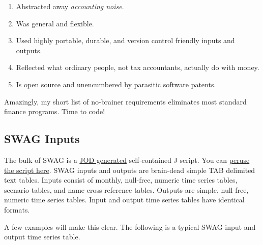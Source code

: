 \begin{enumerate}
\def\labelenumi{\arabic{enumi}.}
\item
  Abstracted away \emph{accounting noise}.
\item
  Was general and flexible.
\item
  Used highly portable, durable, and version control friendly inputs and
  outputs.
\item
  Reflected what ordinary people, not tax accountants, actually do with
  money.
\item
  Is open source and unencumbered by parasitic software patents.
\end{enumerate}

Amazingly, my short list of no-brainer requirements eliminates most
standard finance programs. Time to code!

\subsection*{SWAG Inputs}%

The bulk of SWAG is a
\href{http://code.jsoftware.com/wiki/Addons/general/jod}{JOD generated}
self-contained J script. You can
\href{https://github.com/bakerjd99/jacks/blob/master/swag/scripts/Swag.ijs}{peruse
the script here}. SWAG inputs and outputs are brain-dead simple TAB
delimited text tables. Inputs consist of monthly, null-free, numeric
time series tables, scenario tables, and name cross reference tables.
Outputs are simple, null-free, numeric time series tables. Input and
output time series tables have identical formats.

A few examples will make this clear. The following is a typical SWAG
input and output time series table.


